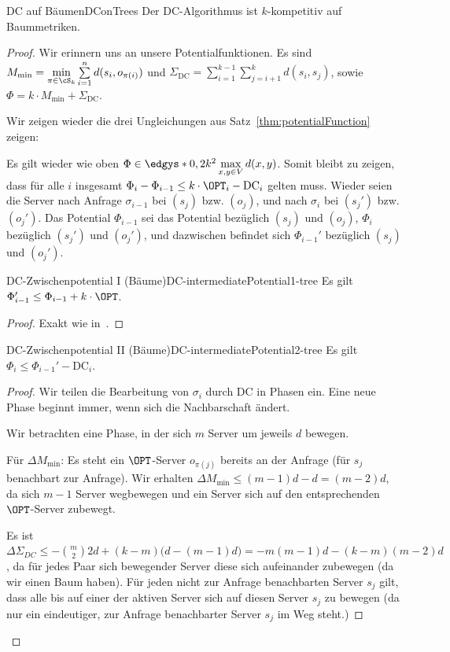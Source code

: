 \documentclass[language=ngerman,algolist]{TemplateLecture}
\begin{document}
\begin{thm}{DC auf Bäumen}{DConTrees}
    Der DC-Algorithmus ist $k$-kompetitiv auf Baummetriken.
\end{thm}
\begin{proof}
    Wir erinnern uns an unsere Potentialfunktionen. Es sind $M_{\min} = \min\limits_{\pi \in \cS_k} \sum\limits_{i = 1}^n d(s_i, o_{\pi(i)})$ und $\Sigma_{\text{DC}} = \sum\limits_{i = 1}^{k-1} \sum\limits_{j = i + 1}^k d(s_i, s_j)$, sowie $\Phi = k \cdot M_{\min} + \Sigma_{\text{DC}}$.

    Wir zeigen wieder die drei Ungleichungen aus Satz~\ref{thm:potentialFunction} zeigen:
    
    Es gilt wieder wie oben $\Phi \in \edgys*{0, 2k^2 \max\limits_{x,y \in V} d(x,y)}$. Somit bleibt zu zeigen, dass für alle $i$ insgesamt $\Phi_i - \Phi_{i-1} \leq k \cdot \OPT_i - \text{DC}_i$ gelten muss. Wieder seien die Server nach Anfrage $\sigma_{i-1}$ bei $(s_j)$ bzw. $(o_j)$, und nach $\sigma_i$ bei $(s_j')$ bzw. $(o_j')$. Das Potential $\Phi_{i-1}$ sei das Potential bezüglich $(s_j)$ und $(o_j)$, $\Phi_i$ bezüglich $(s_j')$ und $(o_j')$, und dazwischen befindet sich $\Phi_{i-1}'$ bezüglich $(s_j)$ und $(o_j')$.
    \begin{lem}{DC-Zwischenpotential I (Bäume)}{DC-intermediatePotential1-tree}
        Es gilt $\Phi_{i-1}' \leq \Phi_{i-1} + k \cdot \OPT$.
    \end{lem}
    \begin{proof}
        Exakt wie in~.
    \end{proof}
    \begin{lem}{DC-Zwischenpotential II (Bäume)}{DC-intermediatePotential2-tree}
        Es gilt $\Phi_i \leq \Phi_{i-1}' - \mathrm{DC}_i$.
    \end{lem}
    \begin{proof}
        Wir teilen die Bearbeitung von $\sigma_i$ durch DC in Phasen ein. Eine neue Phase beginnt immer, wenn sich die Nachbarschaft ändert.

        Wir betrachten eine Phase, in der sich $m$ Server um jeweils $d$ bewegen.

        Für $\Delta M_{\min}$: Es steht ein $\OPT$-Server $o_{\pi(j)}$ bereits an der Anfrage (für $s_j$ benachbart zur Anfrage). Wir erhalten $\Delta M_{\min} \leq (m-1)d - d = (m-2)d$, da sich $m-1$ Server wegbewegen und ein Server sich auf den entsprechenden $\OPT$-Server zubewegt.

        Es ist $\Delta \Sigma_{DC} \leq -\binom{m}{2} 2d + (k-m)\Big(d - (m-1)d\Big) = -m(m-1)d - (k-m)(m-2)d$, da für jedes Paar sich bewegender Server diese sich aufeinander zubewegen (da wir einen Baum haben). Für jeden nicht zur Anfrage benachbarten Server $s_j$ gilt, dass alle bis auf einer der aktiven Server sich auf diesen Server $s_j$ zu bewegen (da nur ein eindeutiger, zur Anfrage benachbarter Server $s_j$ im Weg steht.)
    

\end{proof}
\end{proof}
\end{document}
